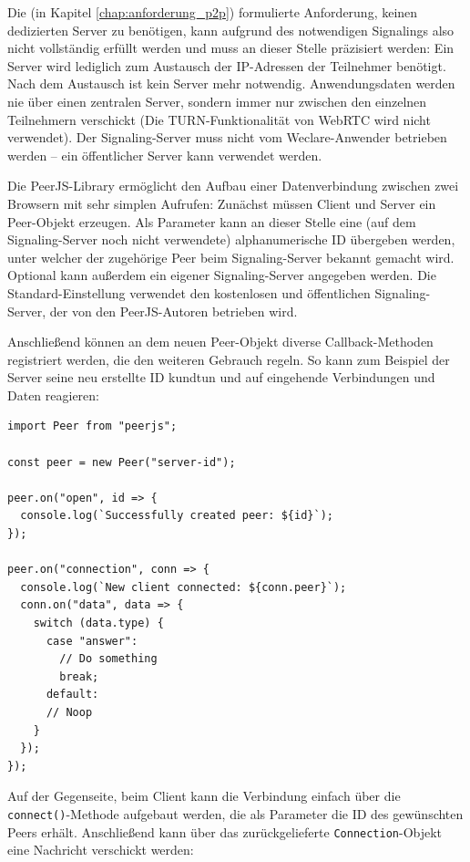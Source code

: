 Die (in Kapitel \ref{chap:anforderung_p2p}) formulierte Anforderung, keinen dedizierten Server zu benötigen, kann aufgrund des notwendigen Signalings also nicht vollständig erfüllt werden und muss an dieser Stelle präzisiert werden: Ein Server wird lediglich zum Austausch der IP-Adressen der Teilnehmer benötigt. Nach dem Austausch ist kein Server mehr notwendig. Anwendungsdaten werden nie über einen zentralen Server, sondern immer nur zwischen den einzelnen Teilnehmern verschickt (Die TURN-Funktionalität von WebRTC wird nicht verwendet). Der Signaling-Server muss nicht vom Weclare-Anwender betrieben werden – ein öffentlicher Server kann verwendet werden.

Die PeerJS-Library ermöglicht den Aufbau einer Datenverbindung zwischen zwei Browsern mit sehr simplen Aufrufen: Zunächst müssen Client und Server ein Peer-Objekt erzeugen. Als Parameter kann an dieser Stelle eine (auf dem Signaling-Server noch nicht verwendete) alphanumerische ID übergeben werden, unter welcher der zugehörige Peer beim Signaling-Server bekannt gemacht wird. Optional kann außerdem ein eigener Signaling-Server angegeben werden. Die Standard-Einstellung verwendet den kostenlosen und öffentlichen Signaling-Server, der von den PeerJS-Autoren betrieben wird.

Anschließend können an dem neuen Peer-Objekt diverse Callback-Methoden registriert werden, die den weiteren Gebrauch regeln. So kann zum Beispiel der Server seine neu erstellte ID kundtun und auf eingehende Verbindungen und Daten reagieren:

\begin{minipage}{\linewidth}
\begin{lstlisting}[caption={Verbindungsaufbau mit der PeerJS-Bibliothek auf der Server-Seite. (aus: src/server/actions/server.js)}]
import Peer from "peerjs";

const peer = new Peer("server-id");

peer.on("open", id => {
  console.log(`Successfully created peer: ${id}`);
});

peer.on("connection", conn => {
  console.log(`New client connected: ${conn.peer}`);
  conn.on("data", data => {
    switch (data.type) {
      case "answer":
        // Do something
        break;
      default:
      // Noop
    }
  });
});
\end{lstlisting}
\end{minipage}

Auf der Gegenseite, beim Client kann die Verbindung einfach über die \texttt{connect()}-Methode aufgebaut werden, die als Parameter die ID des gewünschten Peers erhält. Anschließend kann über das zurückgelieferte \texttt{Connection}-Objekt eine Nachricht verschickt werden:

